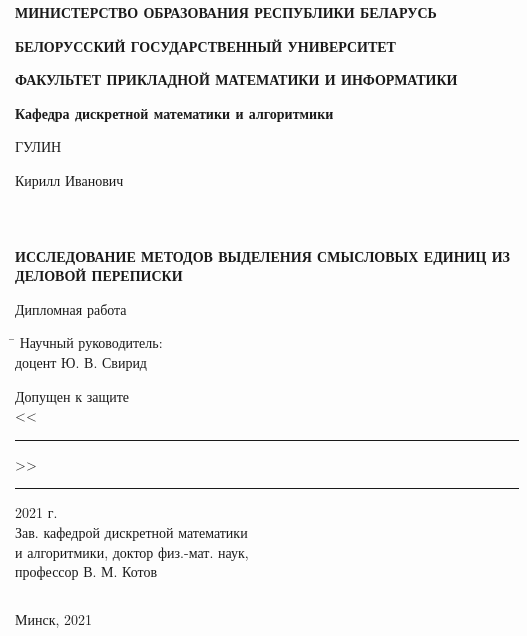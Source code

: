 \begin{titlepage}
\begin{center}

\textbf{МИНИСТЕРСТВО ОБРАЗОВАНИЯ РЕСПУБЛИКИ БЕЛАРУСЬ}
\vspace{1.5 ex}

\textbf{БЕЛОРУССКИЙ ГОСУДАРСТВЕННЫЙ УНИВЕРСИТЕТ}
\vspace{1.5 ex}

\textbf{ФАКУЛЬТЕТ ПРИКЛАДНОЙ МАТЕМАТИКИ И ИНФОРМАТИКИ}
\vspace{1.5 ex}

\textbf{Кафедра дискретной математики и алгоритмики}
\vspace{7 ex}

\noindent
ГУЛИН

\large
Кирилл Иванович
\vspace{5 ex}

$ $

$ $

$ $


\textbf{ИССЛЕДОВАНИЕ МЕТОДОВ ВЫДЕЛЕНИЯ СМЫСЛОВЫХ ЕДИНИЦ ИЗ ДЕЛОВОЙ ПЕРЕПИСКИ}

\vspace{7 ex}
\large
Дипломная работа
\vspace{5 ex}

\begin{tabbing}
\hspace*{107mm}\=\hspace*{7cm}
\kill 
 \> Научный руководитель: \\
 \>  доцент Ю. В. Свирид \\ \vspace{5 ex}

Допущен к защите \\
<<\rule {30pt} {0.5 pt}>>\rule {100pt} {0.5 pt} 2021 г. \> \\
Зав. кафедрой дискретной математики \> \\
и алгоритмики, доктор физ.-мат. наук,\> \\
профессор В. М. Котов
\end{tabbing}

\vfill

$ $

Минск, 2021

\end{center}

\end{titlepage}